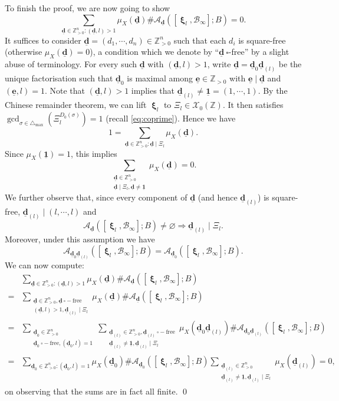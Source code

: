 \documentclass[11pt,letterpaper]{amsart}
\newcommand{\BZ}{{\mathbb {Z}}}
\newcommand{\CA}{{\mathcal {A}}}
\newcommand{\CB}{{\mathcal {B}}}
\newcommand{\CX}{{\mathcal {X}}}
\newcommand{\dd}{\underline{\mathbf{d}}}
\newcommand{\ee}{\underline{\mathbf{e}}}
\DeclareMathOperator{\bxi}{\mathbf{\xi}}
\theoremstyle{plain}
\numberwithin{equation}{section}
\theoremstyle{definition}
\theoremstyle{remark}
\begin{document}
	To finish the proof, we are now going to show $$\sum_{\dd\in\BZ_{>0}^n:(\dd,l)>1}\mu_X(\dd)\#\CA_{\dd}([\bxi_l,\CB_\infty];B)=0.$$ 
	It suffices to consider $\dd=(d_1,\cdots,d_n)\in\BZ_{>0}^n$ such that each $d_i$ is square-free (otherwise $\mu_X(\dd)=0$), a condition which we denote by ``$\dd~\square$-free'' by a slight abuse of terminology. For every such $\dd$ with $(\dd,l)>1$, write $\dd=\dd_0\dd_{(l)}$ be the unique factorisation such that $\dd_0$ is maximal among $\ee\in\BZ_{>0}$ with $\ee\mid \dd$ and $(\ee,l)=1$.
	Note that $(\dd,l)>1$ implies that $\dd_{(l)}\neq \underline{\mathbf{1}}=(1,\cdots,1)$. 
	By the Chinese remainder theorem, we can lift $\bxi_l$ to $\Xi_l\in\CX_0(\BZ)$. It then satisfies $\gcd_{\sigma\in\triangle_{\max}}(\Xi_l^{D_0(\sigma)})=1$ (recall \eqref{eq:coprime}). Hence we have $$1=\sum_{\dd\in\BZ_{>0}^n:\dd\mid \Xi_l}\mu_X(\dd).$$ Since $\mu_X(\underline{\mathbf{1}})=1$, this implies $$\sum_{\substack{\dd\in\BZ_{>0}^n\\\dd\mid \Xi_l,\dd\neq\underline{\mathbf{1}}}}\mu_X(\dd)=0.$$  
	We further observe that, since every component of $\dd$ (and hence $\dd_{(l)}$) is square-free, $\dd_{(l)}\mid (l,\cdots,l)$ and $$\CA_{\dd}([\bxi_l,\CB_\infty];B)\neq\varnothing\Longrightarrow\dd_{(l)}\mid \Xi_l.$$ Moreover, under this assumption we have $$\CA_{\dd_0\dd_{(l)}}([\bxi_l,\CB_\infty];B)=\CA_{\dd_0}([\bxi_l,\CB_\infty];B).$$
	We can now compute:
	\begin{align*}
		&\sum_{\dd\in\BZ_{>0}^n:(\dd,l)>1}\mu_X(\dd)\#\CA_{\dd}([\bxi_l,\CB_\infty];B)\\=&\sum_{\substack{\dd\in\BZ_{>0}^n,\dd~\square-\text{free}\\ (\dd,l)>1,\dd_{(l)}\mid \Xi_l}}\mu_X(\dd)\#\CA_{\dd}([\bxi_l,\CB_\infty];B)\\=&\sum_{\substack{\dd_0\in\BZ_{>0}^n\\\dd_0~\square-\text{free},(\dd_0,l)=1}}\sum_{\substack{\dd_{(l)}\in\BZ_{>0}^n,\dd_{(l)}~\square-\text{free}\\\dd_{(l)}\neq\underline{\mathbf{1}},\dd_{(l)}\mid \Xi_l}}\mu_X(\dd_0\dd_{(l)})\#\CA_{\dd_0\dd_{(l)}}([\bxi_l,\CB_\infty];B)\\
		=&\sum_{\dd_0\in\BZ_{>0}^n:(\dd_0,l)=1}\mu_X(\dd_0)\#\CA_{\dd_0}([\bxi_l,\CB_\infty];B)\sum_{\substack{\dd_{(l)}\in\BZ_{>0}^n\\\dd_{(l)}\neq\underline{\mathbf{1}},\dd_{(l)}\mid \Xi_l}}\mu_X(\dd_{(l)})=0,
	\end{align*}
	on observing that the sums are in fact all finite.
\qed
\end{document}
